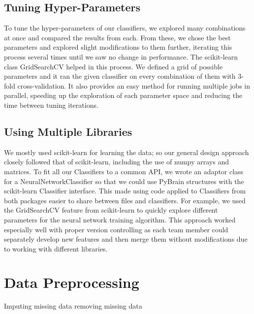 \documentclass{article}
\begin{document}

\subsection{Tuning Hyper-Parameters}


To tune the hyper-parameters of our classifiers, we explored many combinations at once and compared the results from each.
From these, we chose the best parameters and explored slight modifications to them further, iterating this process several times until we saw no change in performance.
The scikit-learn class GridSearchCV helped in this process.
We defined a grid of possible parameters and it ran the given classifier on every combination of them with 3-fold cross-validation.
It also provides an easy method for running multiple jobs in parallel, speeding up the exploration of each parameter space and reducing the time between tuning iterations.

\subsection{Using Multiple Libraries}

We mostly used scikit-learn for learning the data; so our general design approach closely followed that of scikit-learn, including the use of numpy arrays and matrices.
To fit all our Classifiers to a common API, we wrote an adaptor class for a NeuralNetworkClassifier so that we could use PyBrain structures with the scikit-learn Classifier interface.
This made using code applied to Classifiers from both packages easier to share between files and classifiers.
For example, we used the GridSearchCV feature from scikit-learn to quickly explore different parameters for the neural network training algorithm.
This approach worked especially well with proper version controlling as each team member could separately develop new features and then merge them without modifications due to working with different libraries.



\section{Data Preprocessing}
Imputing missing data
removing missing data
\end{document}
